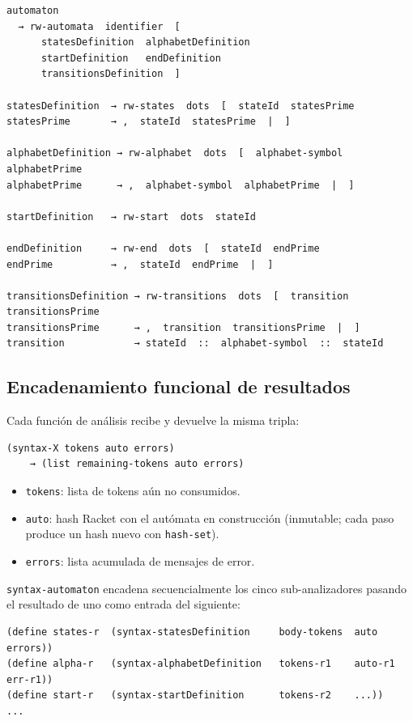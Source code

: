\documentclass{article}
\begin{document}
\begin{verbatim}
automaton
  → rw-automata  identifier  [
      statesDefinition  alphabetDefinition
      startDefinition   endDefinition
      transitionsDefinition  ]

statesDefinition  → rw-states  dots  [  stateId  statesPrime
statesPrime       → ,  stateId  statesPrime  |  ]

alphabetDefinition → rw-alphabet  dots  [  alphabet-symbol  alphabetPrime
alphabetPrime      → ,  alphabet-symbol  alphabetPrime  |  ]

startDefinition   → rw-start  dots  stateId

endDefinition     → rw-end  dots  [  stateId  endPrime
endPrime          → ,  stateId  endPrime  |  ]

transitionsDefinition → rw-transitions  dots  [  transition  transitionsPrime
transitionsPrime      → ,  transition  transitionsPrime  |  ]
transition            → stateId  ::  alphabet-symbol  ::  stateId
\end{verbatim}

\subsection{Encadenamiento funcional de resultados}

Cada función de análisis recibe y devuelve la misma tripla:

\begin{verbatim}
(syntax-X tokens auto errors)
    → (list remaining-tokens auto errors)
\end{verbatim}

\begin{itemize}
  \item \texttt{tokens}: lista de tokens aún no consumidos.
  \item \texttt{auto}: hash Racket con el autómata en construcción (inmutable;
        cada paso produce un hash nuevo con \texttt{hash-set}).
  \item \texttt{errors}: lista acumulada de mensajes de error.
\end{itemize}

\texttt{syntax-automaton} encadena secuencialmente los cinco sub-analizadores
pasando el resultado de uno como entrada del siguiente:

\begin{verbatim}
(define states-r  (syntax-statesDefinition     body-tokens  auto   errors))
(define alpha-r   (syntax-alphabetDefinition   tokens-r1    auto-r1  err-r1))
(define start-r   (syntax-startDefinition      tokens-r2    ...))
...
\end{verbatim}
\end{document}
